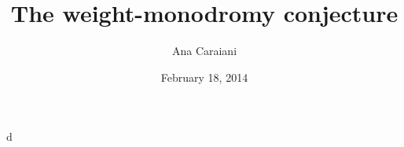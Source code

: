 \documentclass{article}
\title{The weight-monodromy conjecture}
\author{Ana Caraiani}
\date{February 18, 2014}
\begin{document}
\maketitle





d
\end{document}
